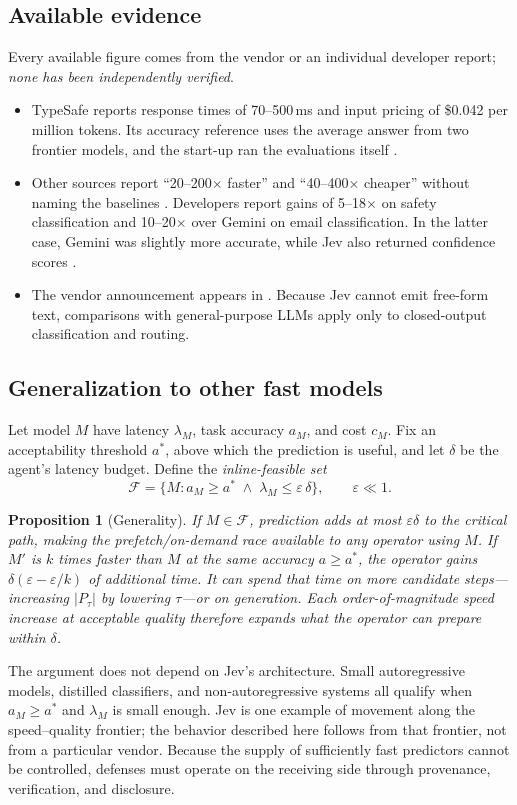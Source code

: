 \documentclass[11pt]{article}
\newtheorem{proposition}{Proposition}
\begin{document}
\subsection{Available evidence}
Every available figure comes from the vendor or an individual developer report; \emph{none has been
independently verified}.
\begin{itemize}
\item TypeSafe reports response times of 70--500\,ms and input pricing of \$0.042 per million tokens.
      Its accuracy reference uses the average answer from two frontier models, and the start-up ran
      the evaluations itself \cite{heise}.
\item Other sources report ``20--200$\times$ faster'' and ``40--400$\times$ cheaper'' without naming
      the baselines \cite{latentspace}. Developers report gains of 5--18$\times$ on safety
      classification and 10--20$\times$ over Gemini on email classification. In the latter case,
      Gemini was slightly more accurate, while Jev also returned confidence scores \cite{techcrunch}.
\item The vendor announcement appears in \cite{typesafe}. Because Jev cannot emit free-form text,
      comparisons with general-purpose LLMs apply only to closed-output classification and routing.
\end{itemize}

\subsection{Generalization to other fast models}
Let model $M$ have latency $\lambda_M$, task accuracy $a_M$, and cost $c_M$. Fix an acceptability
threshold $a^\ast$, above which the prediction is useful, and let $\delta$ be the agent's latency
budget. Define the \emph{inline-feasible set}
\[
\mathcal F=\{M : a_M\ge a^\ast \;\wedge\; \lambda_M\le \varepsilon\,\delta\},\qquad \varepsilon\ll 1 .
\]
\begin{proposition}[Generality]
If $M\in\mathcal F$, prediction adds at most $\varepsilon\delta$ to the critical path, making the
prefetch/on-demand race available to any operator using $M$. If $M'$ is $k$ times faster than $M$ at
the same accuracy $a\ge a^\ast$, the operator gains
$\delta(\varepsilon-\varepsilon/k)$ of additional time. It can spend that time on more candidate
steps---increasing $|P_\tau|$ by lowering $\tau$---or on generation. Each order-of-magnitude speed
increase at acceptable quality therefore expands what the operator can prepare within $\delta$.
\end{proposition}
The argument does not depend on Jev's architecture. Small autoregressive models, distilled
classifiers, and non-autoregressive systems all qualify when $a_M\ge a^\ast$ and $\lambda_M$ is small
enough. Jev is one example of movement along the speed--quality frontier; the behavior described here
follows from that frontier, not from a particular vendor. Because the supply of sufficiently fast
predictors cannot be controlled, defenses must operate on the receiving side through provenance,
verification, and disclosure.
\end{document}
